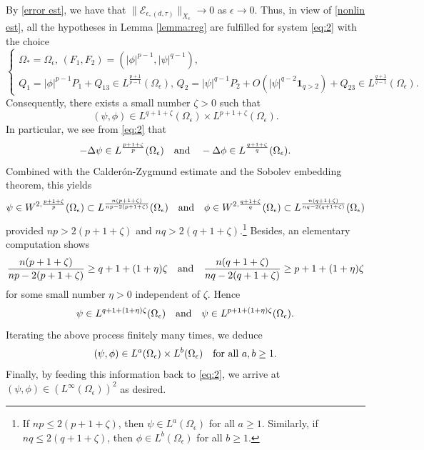 \documentclass[reqno]{amsart}
\theoremstyle{remark}
\newcommand{\ep}{\epsilon}
\newcommand{\mone}{\mathbf{1}}
\newcommand{\mce}{\mathcal{E}}
\renewcommand{\(}{\left(}
\renewcommand{\)}{\right)}
\numberwithin{equation}{section}
\begin{document}
By \eqref{error est}, we have that $\|\mce_{\ep,(d,\tau)}\|_{X_{\ep}} \to 0$ as $\ep \to 0$. Thus, in view of \eqref{nonlin est}, all the hypotheses in Lemma \ref{lemma:reg} are fulfilled for system \eqref{eq:2} with the choice
\[\begin{cases}
\Omega_* = \Omega_\ep,\, (F_1,F_2) = (|\phi|^{p-1},|\psi|^{q-1}),\\
Q_1 = |\phi|^{p-1} P_1 + Q_{13} \in L^{\frac{p+1}{p-1}}(\Omega_\ep),\, Q_2 = |\psi|^{q-1} P_2 + O\(|\psi|^{q-2} \mone_{q>2}\) + Q_{23} \in
L^{\frac{q+1}{q-1}}(\Omega_\ep).
\end{cases}\]%
Consequently, there exists a small number $\zeta > 0$ such that
\[(\psi,\phi) \in L^{q+1+\zeta}(\Omega_\ep) \times L^{p+1+\zeta}(\Omega_\ep).\]
In particular, we see from \eqref{eq:2} that
\[-\Delta \psi \in L^{\frac{p+1+\zeta}{p}}(\Omega_\ep) \quad \textup{and} \quad -\Delta \phi \in L^{\frac{q+1+\zeta}{q}}(\Omega_\ep).\]
Combined with the Calder\'on-Zygmund estimate and the Sobolev embedding theorem, this yields %
\[\psi \in W^{2,\frac{p+1+\zeta}{p}}(\Omega_\ep) \subset L^{\frac{n(p+1+\zeta)}{np-2(p+1+\zeta)}}(\Omega_\ep) \quad \textup{and} \quad \phi \in W^{2,\frac{q+1+\zeta}{q}}(\Omega_\ep) \subset L^{\frac{n(q+1+\zeta)}{nq-2(q+1+\zeta)}}(\Omega_\ep)\]
provided $np > 2(p+1+\zeta)$ and $nq > 2(q+1+\zeta)$.\footnote{If $np \le 2(p+1+\zeta)$, then $\psi \in L^a(\Omega_\ep)$ for all $a \ge 1$. Similarly, if $nq \le 2(q+1+\zeta)$, then $\phi \in L^b(\Omega_\ep)$ for all $b \ge 1$.}
Besides, an elementary computation shows
\[\frac{n(p+1+\zeta)}{np-2(p+1+\zeta)} \ge q+1+(1+\eta)\zeta \quad \textup{and} \quad \frac{n(q+1+\zeta)}{nq-2(q+1+\zeta)} \ge p+1+(1+\eta)\zeta\]
for some small number $\eta > 0$ independent of $\zeta$. Hence
\[\psi \in L^{q+1+(1+\eta)\zeta}(\Omega_\ep) \quad \textup{and} \quad \psi \in L^{p+1+(1+\eta)\zeta}(\Omega_\ep).\]
Iterating the above process finitely many times, we deduce
\[(\psi,\phi) \in L^a(\Omega_\ep) \times L^b(\Omega_\ep) \quad \textup{for all } a, b \ge 1.\]
Finally, by feeding this information back to \eqref{eq:2}, we arrive at $(\psi,\phi) \in (L^{\infty}(\Omega_\ep))^2$ as desired.
\end{document}
